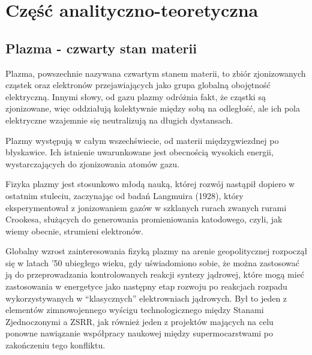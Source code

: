 \section[Część analityczno-teoretyczna]{Część analityczno-teoretyczna} %
    \subsection{Plazma - czwarty stan materii}

    Plazma, powszechnie nazywana czwartym stanem materii, to zbiór
    zjonizowanych cząstek oraz elektronów przejawiających jako grupa globalną
    obojętność elektryczną. Innymi słowy, od gazu plazmy odróżnia fakt, że
    cząstki są zjonizowane, więc oddziałują kolektywnie między sobą na
    odległość, ale ich pola elektryczne wzajemnie się neutralizują na długich
    dystansach.

    Plazmy występują w całym wszechświecie, od materii międzygwiezdnej po
    błyskawice.  Ich istnienie uwarunkowane jest obecnością wysokich energii,
    wystarczających do zjonizowania atomów gazu.

    Fizyka plazmy jest stosunkowo młodą nauką, której rozwój nastąpił dopiero w
    ostatnim stuleciu, zaczynając od badań Langmuira (1928), który
    eksperymentował z jonizowaniem gazów w szklanych rurach zwanych rurami
    Crookesa, służących do generowania promieniowania katodowego, czyli, jak
    wiemy obecnie, strumieni elektronów.

    Globalny wzrost zainteresowania fizyką plazmy na arenie geopolitycznej
    rozpoczął się w latach '50 ubiegłego wieku, gdy uświadomiono sobie, że
    można zastosować ją do przeprowadzania kontrolowanych reakcji syntezy
    jądrowej,  które mogą mieć zastosowania w energetyce jako następny etap
    rozwoju po reakcjach rozpadu wykorzystywanych w ``klasycznych''
    elektrowniach jądrowych. Był to jeden z elementów zimnowojennego wyścigu
    technologicznego między Stanami Zjednoczonymi a ZSRR, jak również jeden z
    projektów mających na celu ponowne nawiązanie współpracy naukowej między
    supermocarstwami po zakończeniu tego konfliktu. 

